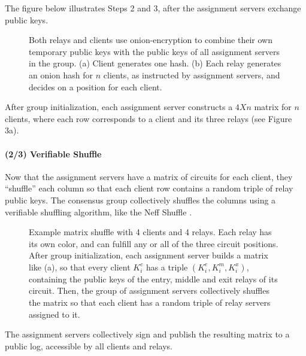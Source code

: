 The figure below illustrates Steps 2 and 3, after the assignment servers
exchange public keys.

\begin{figure}[htbp]
  \centering
  \caption{Both relays and clients use onion-encryption to combine their own
  temporary public keys with the public keys of all assignment servers in the group. (a) Client generates one hash. (b) Each relay generates an onion hash for $n$ clients, as instructed by assignment servers, and decides on a position
  for each client.}
\end{figure}

After group initialization, each assignment server constructs a $4 X n$ matrix for $n$ clients, where each row corresponds to a client and its three relays (see Figure 3a). 

\paragraph{(2/3) Verifiable Shuffle}
Now that the assignment servers have a matrix of circuits for each client, they
``shuffle'' each column so that each client row contains a random triple of
relay public keys. The consensus group collectively shuffles the columns using
a verifiable shuffling algorithm, like the Neff Shuffle \cite{neff2001verifiable}.

\begin{figure}[htb]
\centering
\hspace{\fill}%
\hspace{\fill}%
\hspace*{\fill}%
\caption[bla]{Example matrix shuffle with 4 clients and 4 relays. Each relay
has its own color, and can fulfill any or all of the three circuit positions.
After group initialization, each assignment server builds a matrix like (a), 
so that  every client $K^c_i$ has a triple $(K^e_i, K^m_i, K^x_i)$, containing the public keys of the entry, middle and exit relays of its circuit. Then, the
group of assignment servers collectively shuffles the matrix so that each client has a random triple of relay servers assigned to it.}
\end{figure}

The assignment servers collectively sign and publish the resulting matrix to a public log, accessible by all clients and relays. 

